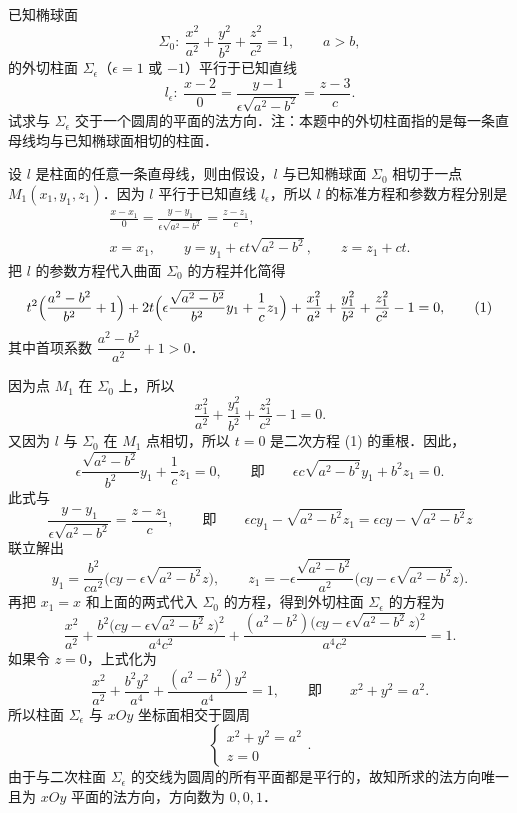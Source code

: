 
已知椭球面
\[
  \Sigma_{0}:\ \frac{x^{2}}{a^{2}}+\frac{y^{2}}{b^{2}}+\frac{z^{2}}{c^{2}}=1,\qquad a>b,
\]
的外切柱面 $\Sigma_{\epsilon}$（$\epsilon=1$ 或 $-1$）平行于已知直线
\[
  l_{\epsilon}:\ \frac{x-2}{0}=\frac{y-1}{\epsilon\sqrt{a^{2}-b^{2}}}=\frac{z-3}{c}.
\]
试求与 $\Sigma_{\epsilon}$ 交于一个圆周的平面的法方向．注：本题中的外切柱面指的是每一条直母线均与已知椭球面相切的柱面．
\begin{solution}
设 $l$ 是柱面的任意一条直母线，则由假设，$l$ 与已知椭球面 $\Sigma_{0}$ 相切于一点 $M_{1}(x_{1},y_{1},z_{1})$．因为 $l$ 平行于已知直线 $l_{\epsilon}$，所以 $l$ 的标准方程和参数方程分别是
\begin{gather*}
  \frac{x-x_{1}}{0}=\frac{y-y_{1}}{\epsilon\sqrt{a^{2}-b^{2}}}=\frac{z-z_{1}}{c},\\
  x=x_{1},\qquad y=y_{1}+\epsilon t\sqrt{a^{2}-b^{2}},\qquad z=z_{1}+ct.
\end{gather*}
把 $l$ 的参数方程代入曲面 $\Sigma_{0}$ 的方程并化简得
\begin{equation}
  t^{2}\Bigl(\frac{a^{2}-b^{2}}{b^{2}}+1\Bigr)+2t\Bigl(\epsilon\frac{\sqrt{a^{2}-b^{2}}}{b^{2}}y_{1}+\frac{1}{c}z_{1}\Bigr)
  +\frac{x_{1}^{2}}{a^{2}}+\frac{y_{1}^{2}}{b^{2}}+\frac{z_{1}^{2}}{c^{2}}-1=0, \tag{1}
\end{equation}
其中首项系数 $\dfrac{a^{2}-b^{2}}{a^{2}}+1>0$．

因为点 $M_{1}$ 在 $\Sigma_{0}$ 上，所以
\[
  \frac{x_{1}^{2}}{a^{2}}+\frac{y_{1}^{2}}{b^{2}}+\frac{z_{1}^{2}}{c^{2}}-1=0.
\]
又因为 $l$ 与 $\Sigma_{0}$ 在 $M_{1}$ 点相切，所以 $t=0$ 是二次方程 (1) 的重根．因此，
\[
  \epsilon\frac{\sqrt{a^{2}-b^{2}}}{b^{2}}y_{1}+\frac{1}{c}z_{1}=0,\qquad\text{即}\qquad
  \epsilon c\sqrt{a^{2}-b^{2}}y_{1}+b^{2}z_{1}=0.
\]
此式与
\[
  \frac{y-y_{1}}{\epsilon\sqrt{a^{2}-b^{2}}}=\frac{z-z_{1}}{c},\qquad\text{即}\qquad
  \epsilon cy_{1}-\sqrt{a^{2}-b^{2}}z_{1}=\epsilon cy-\sqrt{a^{2}-b^{2}}z
\]
联立解出
\[
  y_{1}=\frac{b^{2}}{ca^{2}}\bigl(cy-\epsilon\sqrt{a^{2}-b^{2}}z\bigr),\qquad
  z_{1}=-\epsilon\frac{\sqrt{a^{2}-b^{2}}}{a^{2}}\bigl(cy-\epsilon\sqrt{a^{2}-b^{2}}z\bigr).
\]
再把 $x_{1}=x$ 和上面的两式代入 $\Sigma_{0}$ 的方程，得到外切柱面 $\Sigma_{\epsilon}$ 的方程为
\[
  \frac{x^{2}}{a^{2}}+\frac{b^{2}\bigl(cy-\epsilon\sqrt{a^{2}-b^{2}}z\bigr)^{2}}{a^{4}c^{2}}
  +\frac{(a^{2}-b^{2})\bigl(cy-\epsilon\sqrt{a^{2}-b^{2}}z\bigr)^{2}}{a^{4}c^{2}}=1.
\]
如果令 $z=0$，上式化为
\[
  \frac{x^{2}}{a^{2}}+\frac{b^{2}y^{2}}{a^{4}}+\frac{(a^{2}-b^{2})y^{2}}{a^{4}}=1,\qquad\text{即}\qquad x^{2}+y^{2}=a^{2}.
\]
所以柱面 $\Sigma_{\epsilon}$ 与 $xOy$ 坐标面相交于圆周
\[
  \begin{cases}
    x^{2}+y^{2}=a^{2}\\
    z=0
  \end{cases}.
\]
由于与二次柱面 $\Sigma_{\epsilon}$ 的交线为圆周的所有平面都是平行的，故知所求的法方向唯一且为 $xOy$ 平面的法方向，方向数为 $0,0,1$．
\end{solution}

